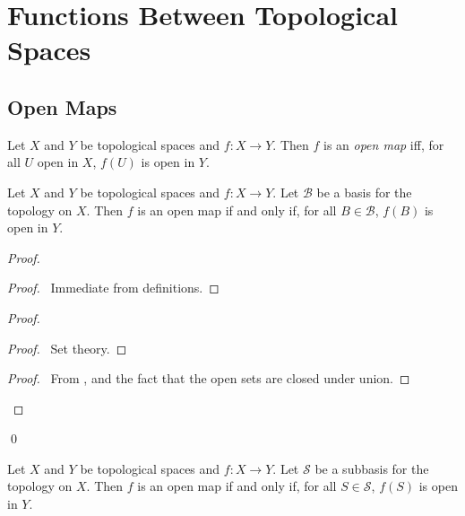 \chapter{Functions Between Topological Spaces}

\section{Open Maps}

\begin{df}
  Let $X$ and $Y$ be topological spaces and $f : X \rightarrow Y$. Then $f$
  is
  an \emph{open map} iff, for all $U$ open in $X$, $f(U)$ is open in $Y$.
\end{df}

\begin{lm}
  \label{lm:topology:open_map:basis}
  Let $X$ and $Y$ be topological spaces and $f : X \rightarrow Y$. Let
  $\mathcal{B}$ be a basis for the topology on $X$. Then $f$ is an open map
  if
  and only if, for all $B \in \mathcal{B}$, $f(B)$ is open in $Y$.
\end{lm}

\begin{proof}
  \pf
  \begin{proof}
    \pf\ Immediate from definitions.
  \end{proof}
  \begin{proof}
    \begin{proof}
      \pf\ Set theory.
    \end{proof}
    \begin{proof}
      \pf\ From ,  and the fact that the open
      sets
      are closed under union.
    \end{proof}
  \end{proof}
  \qed
\end{proof}

\begin{cor}
  \label{cor:topology:open_map:subbasis}
  Let $X$ and $Y$ be topological spaces and $f : X \rightarrow Y$. Let
  $\mathcal{S}$ be a subbasis for the topology on $X$. Then $f$ is an open
  map
  if
  and only if, for all $S \in \mathcal{S}$, $f(S)$ is open in $Y$.
\end{cor}

